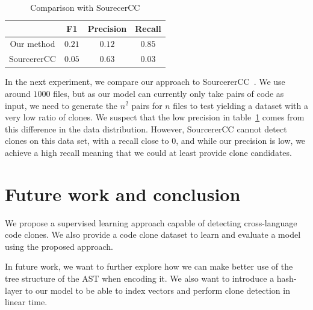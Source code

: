 \documentclass[11pt,a4paper,twocolumn]{article}
\begin{document}
\begin{table}
  \caption{\label{tab:comparison-results}Comparison with SourecerCC}
  \centering
  \begin{tabular}{c c c c}
    & F1 & Precision & Recall\\
    \hline%
    Our method & $0.21$ & $0.12$ & $0.85$\\
    SourcererCC & $0.05$ & $0.63$ & $0.03$
  \end{tabular}
  \vskip -6mm
\end{table}

In the next experiment, we compare our approach to
SourcererCC~\cite{Sajnani:2016:SSC:2884781.2884877}. We use around $1000$ files,
but as our model can currently only take pairs of code as input, we need to
generate the $n^2$ pairs for $n$ files to test yielding a dataset with a very
low ratio of clones. We suspect that the low precision in
table~\ref{tab:comparison-results} comes from this difference in the data
distribution. However, SourcererCC cannot detect clones on this
data set, with a recall close to $0$, and while our precision is low, we achieve
a high recall meaning that we could at least provide clone candidates.
\section{Future work and conclusion}
We propose a supervised learning approach capable of detecting cross-language
code clones. We also provide a code clone dataset to learn and evaluate a model
using the proposed approach.

In future work, we want to further explore how we can make better use of the
tree structure of the AST when encoding it. We also want to introduce a
hash-layer to our model to be able to index vectors and perform clone detection
in linear time.


\end{document}
